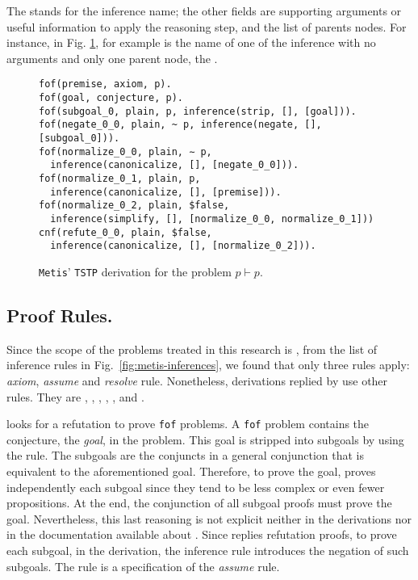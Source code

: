 \documentclass[../main.tex]{subfiles}
\begin{document}
The  stands for the inference name; the other fields are
supporting arguments or useful information to apply the reasoning
step, and the list of parents nodes. For instance, in Fig.
\ref{fig:metis-proof-tstp}, \strip for example is the name of one of the inference with no arguments and only one parent node, the
.

\begin{figure}
\begin{verbatim}
fof(premise, axiom, p).
fof(goal, conjecture, p).
fof(subgoal_0, plain, p, inference(strip, [], [goal])).
fof(negate_0_0, plain, ~ p, inference(negate, [], [subgoal_0])).
fof(normalize_0_0, plain, ∼ p,
  inference(canonicalize, [], [negate_0_0])).
fof(normalize_0_1, plain, p,
  inference(canonicalize, [], [premise])).
fof(normalize_0_2, plain, $false,
  inference(simplify, [], [normalize_0_0, normalize_0_1]))
cnf(refute_0_0, plain, $false,
  inference(canonicalize, [], [normalize_0_2])).
\end{verbatim}
\caption{\texttt{Metis}' \texttt{TSTP} derivation for the
problem $p\vdash p$.}
\label{fig:metis-proof-tstp}
\end{figure}



\subsection{Proof Rules.}
\label{ssec:proof-rules}

Since the scope of the problems treated in this research is \CPL, from the
list of \Metis inference rules in Fig.~\ref{fig:metis-inferences}, we found
that only three rules apply: \emph{axiom}, \emph{assume} and \emph{resolve}
rule.
Nonetheless, \TSTP derivations replied by \Metis use other rules. They are
\canonicalize, \clausify, \conjunct, \simplify, \negate, and \strip.

\Metis looks for a refutation to prove \verb!fof! problems.
A \verb!fof! problem contains the conjecture, the \emph{goal}, in the
problem. This goal is stripped into subgoals by using the \strip rule. The
subgoals are the conjuncts in a general conjunction that is equivalent to the
aforementioned goal.
Therefore, to prove the goal, \Metis proves independently each subgoal since
they tend to be less complex or even fewer propositions. At the end, the
conjunction of all subgoal proofs must prove the goal. Nevertheless, this last
reasoning is not explicit neither in the \TSTP derivations nor in the
documentation available about \Metis.
Since \Metis replies refutation proofs, to prove each subgoal, in the \TSTP
derivation, the inference rule \negate introduces the negation of such
subgoals. The \negate rule is a specification of the \emph{assume} rule.
\end{document}
